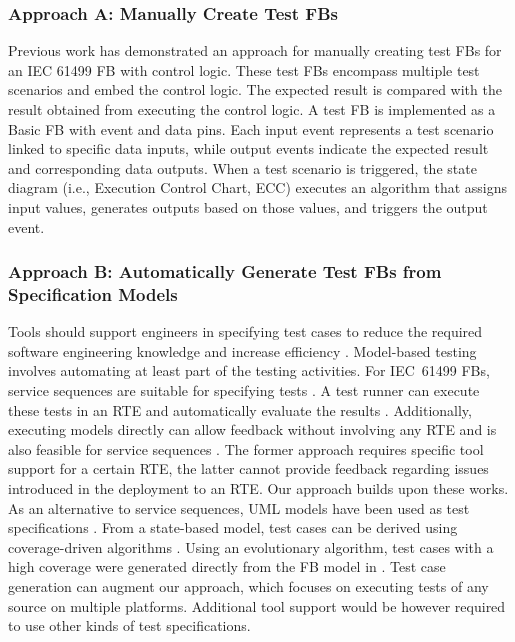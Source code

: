 \subsubsection{Approach A: Manually Create Test FBs}
Previous work has demonstrated an approach for manually creating test FBs \cite{Testing_Midhun} for an IEC 61499 FB with control logic. These test FBs encompass multiple test scenarios and embed the control logic. The expected result is compared with the result obtained from executing the control logic. A test FB is implemented as a Basic FB with event and data pins. Each input event represents a test scenario linked to specific data inputs, while output events indicate the expected result and corresponding data outputs. When a test scenario is triggered, the state diagram (i.e., Execution Control Chart, ECC) executes an algorithm that assigns input values, generates outputs based on those values, and triggers the output event.

\subsubsection{Approach B: Automatically Generate Test FBs from Specification Models}
Tools should support engineers in specifying test cases to reduce the required software engineering knowledge and increase efficiency \cite{hametner2014}. Model-based testing involves automating at least part of the testing activities. For IEC~61499 FBs, service sequences are suitable for specifying tests \cite{hametner2014}. 
A test runner can execute these tests in an RTE and automatically evaluate the results \cite{hametner2014}. Additionally, executing models directly can allow feedback without involving any RTE and is also feasible for service sequences \cite{wiesmayr2021}. The former approach requires specific tool support for a certain RTE, the latter cannot provide feedback regarding issues introduced in the deployment to an RTE. Our approach builds upon these works. 
As an alternative to service sequences, UML models have been used as test specifications \cite{Hussain.2006}. From a state-based model, test cases can be derived using coverage-driven algorithms \cite{Hussain.2006}. Using an evolutionary algorithm, test cases with a high coverage were generated directly from the FB model in \cite{Buzhinsky.2015}. Test case generation can augment our approach, which focuses on executing tests of any source on multiple platforms. Additional tool support would be however required to use other kinds of test specifications.


